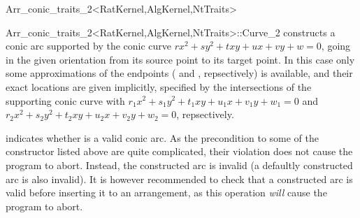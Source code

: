 \begin{ccRefClass}{Arr_conic_traits_2<RatKernel,AlgKernel,NtTraits>}
\begin{ccClass}{Arr_conic_traits_2<RatKernel,AlgKernel,NtTraits>::Curve_2}
    {constructs a conic arc supported by the conic curve 
     $r x^2 + s y^2 + t x y + u x + v y + w = 0$, going
     in the given orientation  from its source point to its target
     point. In this case only some approximations of the endpoints
     ( and , repsectively) is available,
     and their exact locations are given implicitly, specified by the
     intersections of the supporting conic curve with 
     $r_1 x^2 + s_1 y^2 + t_1 x y + u_1 x + v_1 y + w_1 = 0$ and
     $r_2 x^2 + s_2 y^2 + t_2 x y + u_2 x + v_2 y + w_2 = 0$, repsectively.
     }

\ccAccessFunctions


  {indicates whether \ccVar{} is a valid conic arc. As the precondition to
   some of the constructor listed above are quite complicated, their
   violation does not cause the program to abort. Instead, the constructed
   arc is invalid (a defaultly constructed arc is also invalid).
   It is however recommended to check that a constructed arc is valid before
   inserting it to an arrangement, as this operation {\sl will} cause the
   program to abort.}


\end{ccClass}
\end{ccRefClass}
